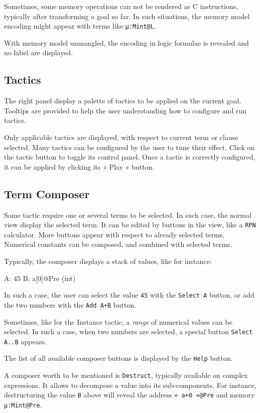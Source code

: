 Sometimes, some memory operations can not be rendered as C instructions, typically after transforming a goal so far. In such situations, the memory model encoding might appear with terms like \texttt{µ:Mint@L}.

With memory model unmangled, the encoding in logic formulae is revealed and no label are displayed.

\subsection{Tactics}

The right panel display a palette of tactics to be applied on the current goal. Tooltips are provided to help the user understanding how to configure and run tactics.

Only applicable tactics are displayed, with respect to current term or clause selected. Many tactics can be configured by the user to tune their effect. Click on the tactic button to toggle its control panel. Once a tactic is correctly configured, it can be applied by clicking its « Play » button.

\subsection{Term Composer}

Some tactic require one or several terms to be selected.
In such case, the normal view display the selected term.
It can be edited by buttons in the view, like a \texttt{RPN} calculator. More buttons appear with respect to already selected terms. Numerical constants can be composed, and combined with selected terms.

Typically, the composer displays a stack of values, like for instance:
\begin{ccode}
  A: 45
  B: a[0]@Pre (int)
\end{ccode}

In such a case, the user can select the value \texttt{45} with the \texttt{Select A} button, or add the two numbers with the \texttt{Add A+B} button.

Sometimes, like for the Instance tactic, a \emph{range} of numerical values can be selected. In such a case, when two numbers are selected, a special button \texttt{Select A..B} appears.

The list of all available composer buttons is displayed by the \texttt{Help} button.

A composer worth to be mentioned is \texttt{Destruct}, typically available on complex expressions. It allows to decompose a value into its sub-components. For instance, destructuring the value \texttt{B} above will reveal the address \texttt{« a+0 »@Pre} and memory \texttt{µ:Mint@Pre}.

